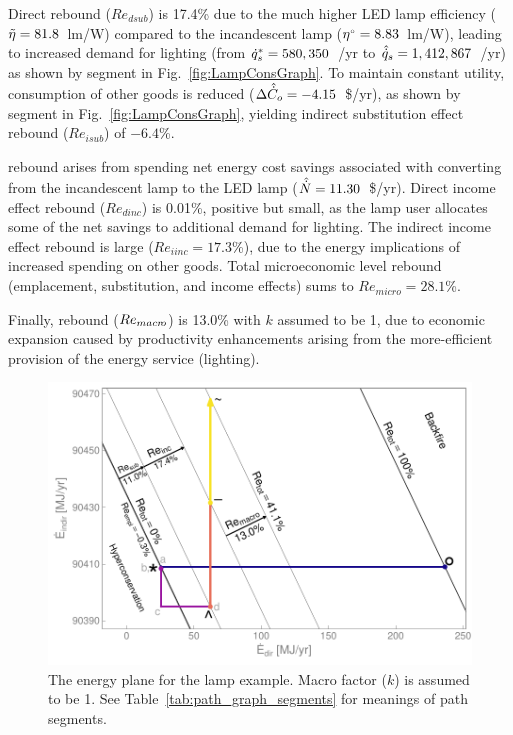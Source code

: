 \documentclass[12pt]{article}\usepackage[]{graphicx}\usepackage[]{xcolor}
\makeatletter
\def\maxwidth{ %
  \ifdim\Gin@nat@width>\linewidth
    \linewidth
  \else
    \Gin@nat@width
  \fi
}
\newenvironment{knitrout}{}{} %
\makeatother
\begin{document}
Direct \subeffect{} rebound
($Re_{dsub}$) is 17.4\%
due to the much higher LED lamp efficiency
($\tilde{\eta} = 81.8$~lm/W)
compared to the incandescent lamp
(${}{\eta}^{\scriptscriptstyle \circ} = 8.83$~lm/W),
leading to increased demand for lighting
(from ${\dot{q}}^*_s = 580,350$~\lmhr/yr
to $\hat{\dot{q}}_s = 1,412,867$~\lmhr/yr)
as shown by segment \chat{} in Fig.~\ref{fig:LampConsGraph}.
To maintain constant utility,
consumption of other goods is reduced
($\Delta \hat{\dot{C}}_o = -4.15$~\$/yr),
as shown by segment \starc{} in Fig.~\ref{fig:LampConsGraph},
yielding indirect substitution effect rebound
($Re_{isub}$) of $-6.4$\%.

\Inceffect{} rebound arises from spending net energy cost savings
associated with converting from the incandescent lamp to the LED lamp
($\hat{\dot{N}} = 11.30$~\$/yr).
Direct income effect rebound
($Re_{dinc}$) is 0.01\%,
positive but small,
as the lamp user allocates
some of the net savings to additional demand for lighting.
The indirect income effect rebound is large
($Re_{iinc} = 17.3$\%),
due to the energy implications of increased spending on other goods.
Total microeconomic level rebound (emplacement, substitution, and income effects)
sums to $Re_{micro} = 28.1$\%.

Finally, \macroeffect{} rebound
($Re_{macr\!o}$) is 13.0\%
with $k$ assumed to be 1,
due to economic expansion caused by
productivity enhancements arising from the more-efficient provision of the
energy service (lighting).


\begin{knitrout}
\color{fgcolor}\begin{figure}

{\centering \includegraphics[width=\maxwidth]{figure/LampEnergyGraph-1} 

}

\caption{The energy plane for the lamp example. Macro factor ($k$) is assumed to be 1. See Table~\ref{tab:path_graph_segments} for meanings of path segments.}\label{fig:LampEnergyGraph}
\end{figure}

\end{knitrout}
\end{document}
